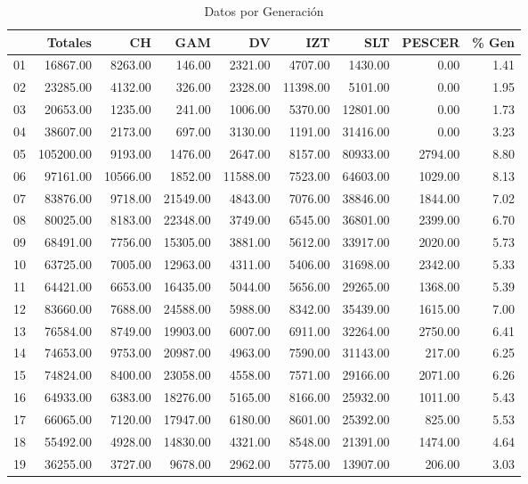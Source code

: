 \documentclass[12pt]{article}
\begin{document}
\begin{table}[ht]
\centering
\caption{Datos por Generación} 
\begin{tabular}{rrrrrrrrr}
  \hline
 & Totales & CH & GAM & DV & IZT & SLT & PESCER & \% Gen \\ 
  \hline
01 & 16867.00 & 8263.00 & 146.00 & 2321.00 & 4707.00 & 1430.00 & 0.00 & 1.41 \\ 
  02 & 23285.00 & 4132.00 & 326.00 & 2328.00 & 11398.00 & 5101.00 & 0.00 & 1.95 \\ 
  03 & 20653.00 & 1235.00 & 241.00 & 1006.00 & 5370.00 & 12801.00 & 0.00 & 1.73 \\ 
  04 & 38607.00 & 2173.00 & 697.00 & 3130.00 & 1191.00 & 31416.00 & 0.00 & 3.23 \\ 
  05 & 105200.00 & 9193.00 & 1476.00 & 2647.00 & 8157.00 & 80933.00 & 2794.00 & 8.80 \\ 
  06 & 97161.00 & 10566.00 & 1852.00 & 11588.00 & 7523.00 & 64603.00 & 1029.00 & 8.13 \\ 
  07 & 83876.00 & 9718.00 & 21549.00 & 4843.00 & 7076.00 & 38846.00 & 1844.00 & 7.02 \\ 
  08 & 80025.00 & 8183.00 & 22348.00 & 3749.00 & 6545.00 & 36801.00 & 2399.00 & 6.70 \\ 
  09 & 68491.00 & 7756.00 & 15305.00 & 3881.00 & 5612.00 & 33917.00 & 2020.00 & 5.73 \\ 
  10 & 63725.00 & 7005.00 & 12963.00 & 4311.00 & 5406.00 & 31698.00 & 2342.00 & 5.33 \\ 
  11 & 64421.00 & 6653.00 & 16435.00 & 5044.00 & 5656.00 & 29265.00 & 1368.00 & 5.39 \\ 
  12 & 83660.00 & 7688.00 & 24588.00 & 5988.00 & 8342.00 & 35439.00 & 1615.00 & 7.00 \\ 
  13 & 76584.00 & 8749.00 & 19903.00 & 6007.00 & 6911.00 & 32264.00 & 2750.00 & 6.41 \\ 
  14 & 74653.00 & 9753.00 & 20987.00 & 4963.00 & 7590.00 & 31143.00 & 217.00 & 6.25 \\ 
  15 & 74824.00 & 8400.00 & 23058.00 & 4558.00 & 7571.00 & 29166.00 & 2071.00 & 6.26 \\ 
  16 & 64933.00 & 6383.00 & 18276.00 & 5165.00 & 8166.00 & 25932.00 & 1011.00 & 5.43 \\ 
  17 & 66065.00 & 7120.00 & 17947.00 & 6180.00 & 8601.00 & 25392.00 & 825.00 & 5.53 \\ 
  18 & 55492.00 & 4928.00 & 14830.00 & 4321.00 & 8548.00 & 21391.00 & 1474.00 & 4.64 \\ 
  19 & 36255.00 & 3727.00 & 9678.00 & 2962.00 & 5775.00 & 13907.00 & 206.00 & 3.03 \\ 
   \hline
\end{tabular}
\end{table}
\end{document}
